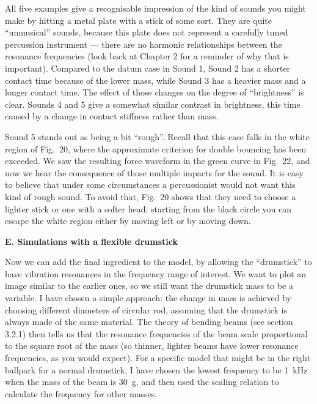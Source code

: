   All five examples give a recognisable impression of the kind of sounds you 
  might make by hitting a metal plate with a stick of some sort. They are quite 
  “unmusical” sounds, because this plate does not represent a carefully tuned 
  percussion instrument — there are no harmonic relationships between the 
  resonance frequencies (look back at Chapter 2 for a reminder of why that is 
  important). Compared to the datum case in Sound 1, Sound 2 has a shorter 
  contact time because of the lower mass, while Sound 3 has a heavier mass and 
  a longer contact time. The effect of those changes on the degree of 
  “brightness” is clear. Sounds 4 and 5 give a somewhat similar contrast in 
  brightness, this time caused by a change in contact stiffness rather than 
  mass. 

  Sound 5 stands out as being a bit “rough”. Recall that this case falls in the 
  white region of Fig.\ 20, where the approximate criterion for double bouncing 
  has been exceeded. We saw the resulting force waveform in the green curve in 
  Fig.\ 22, and now we hear the consequence of those multiple impacts for the 
  sound. It is easy to believe that under some circumstances a percussionist 
  would not want this kind of rough sound. To avoid that, Fig.\ 20 shows that 
  they need to choose a lighter stick or one with a softer head: starting from 
  the black circle you can escape the white region either by moving left or by 
  moving down. 

  \textbf{E. Simulations with a flexible drumstick} 

  Now we can add the final ingredient to the model, by allowing the “drumstick” 
  to have vibration resonances in the frequency range of interest. We want to 
  plot an image similar to the earlier ones, so we still want the drumstick 
  mass to be a variable. I have chosen a simple approach: the change in mass is 
  achieved by choosing different diameters of circular rod, assuming that the 
  drumstick is always made of the same material. The theory of bending beams 
  (see section 3.2.1) then tells us that the resonance frequencies of the beam 
  scale proportional to the square root of the mass (so thinner, lighter beams 
  have lower resonance frequencies, as you would expect). For a specific model 
  that might be in the right ballpark for a normal drumstick, I have chosen the 
  lowest frequency to be 1~kHz when the mass of the beam is 30~g, and then used 
  the scaling relation to calculate the frequency for other masses. 

